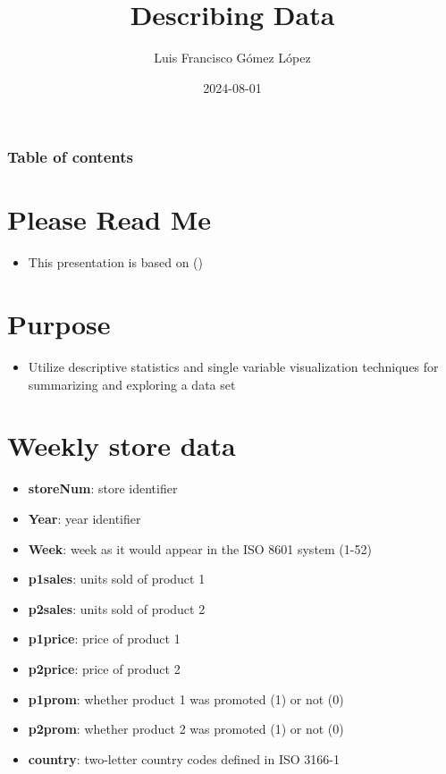 \documentclass[
  ignorenonframetext,
]{beamer}
\title{Describing Data}
\author{Luis Francisco Gómez López}
\date{2024-08-01}
\institute{FAEDIS}
\providecommand{\tightlist}{%
  \setlength{\itemsep}{0pt}\setlength{\parskip}{0pt}}\usepackage{longtable,booktabs,array}
\renewcommand*\contentsname{Table of contents}
\newcommand\contentsname{Table of contents}
\begin{document}
\frame{\titlepage}

\renewcommand*\contentsname{Table of contents}
\begin{frame}[allowframebreaks]
  \frametitle{Table of contents}
  \tableofcontents[hideallsubsections]
\end{frame}

\section{Please Read Me}\label{please-read-me}

\begin{frame}{}
\label{section}
\begin{itemize}
\tightlist
\item
  This presentation is based on ()
\end{itemize}
\end{frame}

\section{Purpose}\label{purpose}

\begin{frame}{}
\label{section-1}
\begin{itemize}
\tightlist
\item
  Utilize descriptive statistics and single variable visualization
  techniques for summarizing and exploring a data set
\end{itemize}
\end{frame}

\section{Weekly store data}\label{weekly-store-data}

\begin{frame}{}
\label{section-2}
\begin{itemize}
\tightlist
\item
  \textbf{storeNum}: store identifier
\item
  \textbf{Year}: year identifier
\item
  \textbf{Week}: week as it would appear in the ISO 8601 system (1-52)
\item
  \textbf{p1sales}: units sold of product 1
\item
  \textbf{p2sales}: units sold of product 2
\item
  \textbf{p1price}: price of product 1
\item
  \textbf{p2price}: price of product 2
\item
  \textbf{p1prom}: whether product 1 was promoted (1) or not (0)
\item
  \textbf{p2prom}: whether product 2 was promoted (1) or not (0)
\item
  \textbf{country}: two-letter country codes defined in ISO 3166-1
\end{itemize}
\end{frame}
\end{document}
